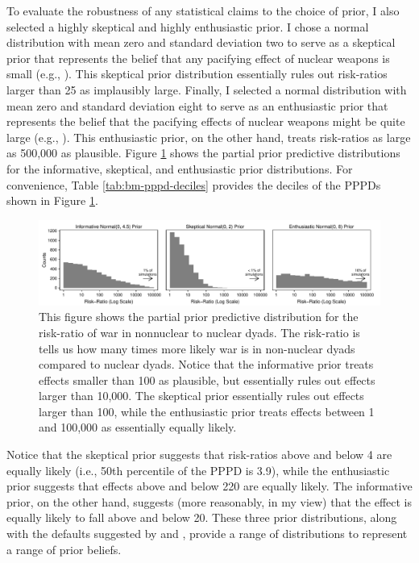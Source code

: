 \documentclass[12pt]{article}
\begin{document}
To evaluate the robustness of any statistical claims to the choice of prior, I also selected a highly skeptical and highly enthusiastic prior. I chose a normal distribution with mean zero and standard deviation two to serve as a skeptical prior that represents the belief that any pacifying effect of nuclear weapons is small (e.g., \citealt{Mueller1988}). This skeptical prior distribution essentially rules out risk-ratios larger than 25 as implausibly large. Finally, I selected a normal distribution with mean zero and standard deviation eight to serve as an enthusiastic prior that represents the belief that the pacifying effects of nuclear weapons might be quite large (e.g., \citealt{Mearsheimer1993}). This enthusiastic prior, on the other hand, treats risk-ratios as large as 500,000 as plausible. 
Figure \ref{fig:bm-pppd-hist} shows the partial prior predictive distributions for the informative, skeptical, and enthusiastic prior distributions. For convenience, Table \ref{tab:bm-pppd-deciles} provides the deciles of the PPPDs shown in Figure \ref{fig:bm-pppd-hist}. 

\begin{figure}[H]
\begin{center}
\includegraphics[scale = .8]{figs/bm-pppd-hist.pdf}
\caption{This figure shows the partial prior predictive distribution for the risk-ratio of war in nonnuclear to nuclear dyads. The risk-ratio is tells us how many times more likely war is in non-nuclear dyads compared to nuclear dyads. Notice that the informative prior treats effects smaller than 100 as plausible, but essentially rules out effects larger than 10,000. The skeptical prior essentially rules out effects larger than 100, while the enthusiastic prior treats effects between 1 and 100,000 as essentially equally likely.}\label{fig:bm-pppd-hist}
\end{center}
\end{figure}



Notice that the skeptical prior suggests that risk-ratios above and below 4 are equally likely (i.e., 50th percentile of the PPPD is 3.9), while the enthusiastic prior suggests that effects above and below 220 are equally likely. The informative prior, on the other hand, suggests (more reasonably, in my view) that the effect is equally likely to fall above and below 20. These three prior distributions, along with the defaults suggested by \cite{Zorn2005} and \cite{Gelmanetal2008}, provide a range of distributions to represent a range of prior beliefs.
\end{document}
